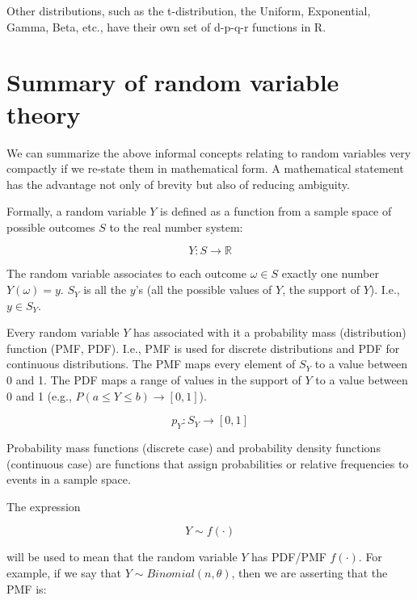 \documentclass[12pt,]{krantz}
\begin{document}
Other distributions, such as the t-distribution, the Uniform, Exponential, Gamma, Beta, etc., have their own set of d-p-q-r functions in R.

\hypertarget{summary-of-random-variable-theory}{%
\section{Summary of random variable theory}\label{summary-of-random-variable-theory}}

We can summarize the above informal concepts relating to random variables very compactly if we re-state them in mathematical form. A mathematical statement has the advantage not only of brevity but also of reducing ambiguity.

Formally, a random variable \(Y\) is defined as a function from a sample space of possible outcomes \(S\) to the real number system:

\begin{equation}
Y : S \rightarrow \mathbb{R}
\end{equation}

The random variable associates to each outcome \(\omega \in S\) exactly one number \(Y(\omega) = y\). \(S_Y\) is all the \(y\)'s (all the possible values of \(Y\), the support of \(Y\)). I.e., \(y \in S_Y\).

Every random variable \(Y\) has associated with it a probability mass (distribution) function (PMF, PDF). I.e., PMF is used for discrete distributions and PDF for continuous distributions. The PMF maps every element of \(S_Y\) to a value between 0 and 1. The PDF maps a range of values in the support of \(Y\) to a value between 0 and 1 (e.g., \(P(a \leq Y\leq b) \rightarrow [0, 1]\)).

\begin{equation}
p_Y : S_Y \rightarrow [0, 1] 
\end{equation}

Probability mass functions (discrete case) and probability density functions (continuous case) are functions that assign probabilities or relative frequencies to events in a sample space.

The expression

\begin{equation}
 Y \sim f(\cdot)
\end{equation}

\noindent
will be used to mean that the random variable \(Y\) has PDF/PMF \(f(\cdot)\).
For example, if we say that \(Y \sim Binomial(n,\theta)\), then we are asserting that the PMF is:
\end{document}
